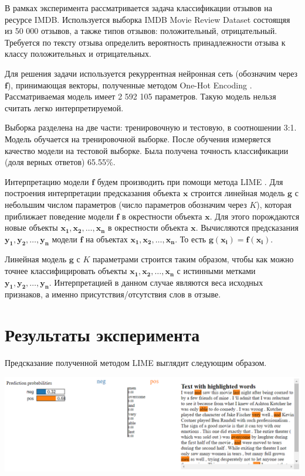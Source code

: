 \documentclass[a4paper, 12pt]{article}
\begin{document}
В рамках эксперимента рассматривается задача классификации отзывов на ресурсе IMDB. Используется выборка IMDB Movie Review Dataset \cite{maas-EtAl:2011:ACL-HLT2011} состоящяя из 50 000 отзывов, а также типов отзывов: положительный, отрицательный. Требуется по тексту отзыва определить вероятность принадлежности отзыва к классу положительных и отрицательных.

Для решения задачи используется рекуррентная нейронная сеть (обозначим через $\mathbf{f}$), принимающая векторы, полученные методом One-Hot Encoding \cite{onehot2018}. Рассматриваемая модель имеет 2 592 105 параметров. Такую модель нельзя считать легко интерпретируемой.

Выборка разделена на две части: тренировочную и тестовую, в соотношении 3:1. Модель обучается на тренировочной выборке. После обучения измеряется качество модели на тестовой выборке. Была получена точность классификации (доля верных ответов) 65.55\%.

Интерпретацию модели $\mathbf{f}$ будем производить при помощи метода LIME \cite{ribeiro2016why}. Для построения интерпретации предсказания объекта $\mathbf{x}$ строится линейная модель $\mathbf{g}$ с небольшим числом параметров (число параметров обозначим через $K$), которая приближает поведение модели $\mathbf{f}$ в окрестности объекта $\mathbf{x}$. Для этого порождаются новые объекты $\mathbf{x_1}, \mathbf{x_2}, \dots, \mathbf{x_n}$ в окрестности объекта $\mathbf{x}$. Вычисляются предсказания $\mathbf{y_1}, \mathbf{y_2}, \dots, \mathbf{y_n}$ модели $\mathbf{f}$ на объектах $\mathbf{x_1}, \mathbf{x_2}, \dots, \mathbf{x_n}$. То есть $\mathbf{g}(\mathbf{x_i})=\mathbf{f}(\mathbf{x_i})$.

Линейная модель $\mathbf{g}$ с $K$ параметрами строится таким образом, чтобы как можно точнее классифицировать объекты $\mathbf{x_1}, \mathbf{x_2}, \dots, \mathbf{x_n}$ с истинными метками $\mathbf{y_1}, \mathbf{y_2}, \dots, \mathbf{y_n}$. Интерпретацией в данном случае являются веса исходных признаков, а именно присутствия/отсутствия слов в отзыве.

\section{Результаты эксперимента}

Предсказание полученной методом LIME выглядит следующим образом.

\includegraphics[width=\textwidth]{figures/lime_exp.png}
\end{document}
